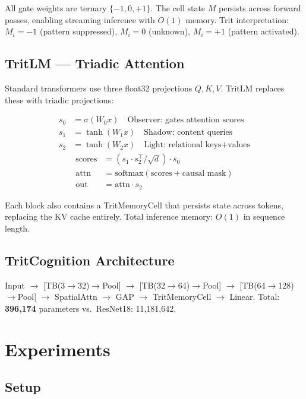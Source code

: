 \documentclass[10pt,twocolumn]{article}
\newcommand{\tritnet}{TritCognition}
\newcommand{\tritlm}{TritLM}
\begin{document}
All gate weights are ternary $\{-1,0,+1\}$. The cell state $M$ persists
across forward passes, enabling streaming inference with $O(1)$ memory.
Trit interpretation: $M_i{=}-1$ (pattern suppressed),
$M_i{=}0$ (unknown), $M_i{=}+1$ (pattern activated).

\subsection{\tritlm{} --- Triadic Attention}

Standard transformers use three float32 projections $Q,K,V$.
\tritlm{} replaces these with triadic projections:

\begin{align}
  s_0 &= \sigma(W_0 x) \quad \text{Observer: gates attention scores} \\
  s_1 &= \tanh(W_1 x) \quad \text{Shadow: content queries} \\
  s_2 &= \tanh(W_2 x) \quad \text{Light: relational keys+values}
\end{align}
\begin{align}
  \text{scores} &= (s_1 \cdot s_2^\top / \sqrt{d}) \cdot \bar{s}_0 \\
  \text{attn}   &= \text{softmax}(\text{scores} + \text{causal mask}) \\
  \text{out}    &= \text{attn} \cdot s_2
\end{align}

Each block also contains a TritMemoryCell that persists state across
tokens, replacing the KV cache entirely. Total inference memory:
$O(1)$ in sequence length.

\subsection{\tritnet{} Architecture}

Input $\to$ [TB(3$\to$32)$\to$Pool] $\to$ [TB(32$\to$64)$\to$Pool]
$\to$ [TB(64$\to$128)$\to$Pool] $\to$ SpatialAttn $\to$ GAP
$\to$ TritMemoryCell $\to$ Linear.
Total: \textbf{396,174} parameters vs.\ ResNet18: 11,181,642.

\section{Experiments}

\subsection{Setup}
\end{document}
